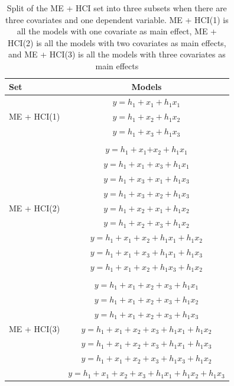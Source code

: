 \begin{table}[hbt!]
\caption{Split of the ME + HCI set into three subsets when there are three covariates and one dependent variable. ME + HCI(1) is all the models with one covariate as main effect, ME + HCI(2) is all the models with two covariates as main effects, and ME + HCI(3) is all the models with three covariates as main effects}
\centering
\begin{tabular}{lc}  
\toprule
Set & Models \\
\midrule
\multirow{3}{*}{ME + HCI(1)} & $y=h_1+x_1+h_1x_1$\\ & $y=h_1+x_2+h_1x_2$\\ & $y=h_1+x_3+h_1x_3$\\ & \\ 
\multirow{9}{*}{ME + HCI(2)} & $y=h_1+x_1$$+x_2+h_1x_1$\\ & $y=h_1+x_1+x_3+h_1x_1$\\ & $y=h_1+x_3+x_1+h_1x_3$\\ & $y=h_1+x_3+x_2+h_1x_3$\\ & $y=h_1+x_2+x_1+h_1x_2$\\ & $y=h_1+x_2+x_3+h_1x_2$\\ & $y=h_1+x_1+x_2+h_1x_1+h_1x_2$\\ & $y=h_1+x_1+x_3+h_1x_1+h_1x_3$\\ & $y=h_1+x_1+x_2+h_1x_3+h_1x_2$\\  & \\  
\multirow{7}{*}{ME + HCI(3)} & $y=h_1+x_1+x_2+x_3+h_1x_1$\\ & $y=h_1+x_1+x_2+x_3+h_1x_2$\\ & $y=h_1+x_1+x_2+x_3+h_1x_3$\\ & $y=h_1+x_1+x_2+x_3+h_1x_1+h_1x_2$\\ & $y=h_1+x_1+x_2+x_3+h_1x_1+h_1x_3$\\ & $y=h_1+x_1+x_2+x_3+h_1x_3+h_1x_2$\\ & $y=h_1+x_1+x_2+x_3+h_1x_1+h_1x_2+h_1x_3$\\  
\bottomrule
\end{tabular}
\end{table}

